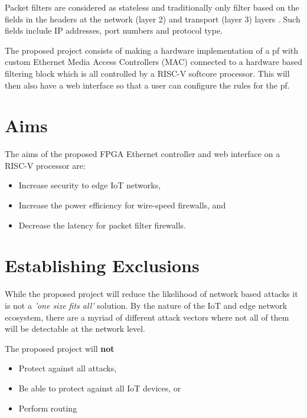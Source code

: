 Packet filters are considered as stateless and traditionally only filter based on the fields in the headers at the network (layer 2) and transport 
(layer 3) layers \cite{FirewallsBook}. Such fields include IP addresses, port numbers and protocol type.

The proposed project consists of making a hardware implementation of a pf with custom Ethernet Media Access Controllers (MAC) connected to a hardware
based filtering block which is all controlled by a RISC-V softcore processor. This will then also have a web interface so that a user can configure
the rules for the pf.



\section{Aims}

The aims of the proposed FPGA Ethernet controller and web interface on a RISC-V processor are:

\begin{itemize}
    \item Increase security to edge IoT networks,
    \item Increase the power efficiency for wire-speed firewalls, and
    \item Decrease the latency for packet filter firewalls.
\end{itemize}



\section{Establishing Exclusions}

While the proposed project will reduce the likelihood of network based attacks it is not a \textit{'one size fits all'} solution. 
By the nature of the IoT and edge network ecosystem, there are a myriad of different attack vectors where not all of them will be detectable at the
network level.

The proposed project will \textbf{not}
\begin{itemize}
    \item Protect against all attacks,
    \item Be able to protect against all IoT devices, or
    \item Perform routing
\end{itemize}